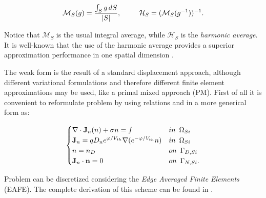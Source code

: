 \begin{equation*}
\mathcal{M}_S(g) = \dfrac{\int_S g \, dS}{|S|}, \psp{15} \mathcal{H}_S = (\mathcal{M}_S(g^{-1}))^{-1} .
\end{equation*}

Notice that $\mathcal{M}_S$ is the usual integral average, while $\mathcal{H}_S$ is the \textit{harmonic average}. It is well-known that the use of the harmonic average provides a superior approximation performance in one spatial dimension \cite{BabuskaMixMet}.

The weak form   is the result of a standard displacement approach, although different variational formulations and therefore different finite element approximations may be used, like a primal mixed approach (PM).  First of all it is convenient to reformulate problem  by using relations  and  in a more generical form as:

\begin{equation}
\label{eq: LEC system slotboom generic}
\begin{cases}
\nabla \cdot \vect{J}_n(n)  +\sigma n = f & in \psp{3} \Omega_{Si}
 \\
 \vect{J}_n = qD_n e^{\varphi/V_{th}} \nabla (e^{-\varphi/V_{th}}n) & in \psp{3} \Omega_{Si}\\
n = n_D & on \psp{3} \Gamma_{D,Si}
 \\
 \vect{J}_n \cdot \vect{n} = 0 & on \psp{3} \Gamma_{N,Si}.
\end{cases}
\end{equation}

Problem  can be discretized considering the \textit{Edge Averaged Finite Elements} (EAFE). The complete derivation of this scheme can be found in \cite{Zikatanov:EAFE1} \cite{Zikatanov:EAFE2}.

